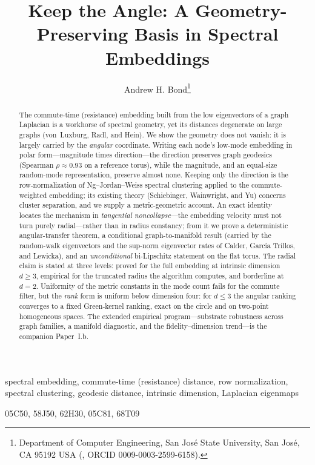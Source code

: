 \documentclass[review]{siamart220329}
\title{Keep the Angle: A Geometry-Preserving Basis in Spectral Embeddings}
\author{Andrew H. Bond\thanks{Department of Computer Engineering, San Jos\'e
State University, San Jos\'e, CA 95192 USA (\email{andrew.bond@sjsu.edu}, ORCID
0009-0003-2599-6158).}}
\begin{document}
\maketitle

\begin{abstract}
The commute-time (resistance) embedding built from the low eigenvectors of a
graph Laplacian is a workhorse of spectral geometry, yet its distances degenerate
on large graphs (von~Luxburg, Radl, and Hein). We show the geometry does not
vanish: it is largely carried by the \emph{angular} coordinate. Writing each
node's low-mode embedding in polar form---magnitude times direction---the
direction preserves graph geodesics (Spearman $\rho\approx0.93$ on a reference
torus), while the magnitude, and an equal-size random-mode representation,
preserve almost none. Keeping only the direction is the row-normalization of
Ng--Jordan--Weiss spectral clustering applied to the commute-weighted embedding;
its existing theory (Schiebinger, Wainwright, and Yu) concerns cluster
separation, and we supply a metric-geometric account. An exact identity locates
the mechanism in \emph{tangential noncollapse}---the embedding velocity must not
turn purely radial---rather than in radius constancy; from it we prove a
deterministic angular-transfer theorem, a conditional graph-to-manifold result
(carried by the random-walk eigenvectors and the sup-norm eigenvector rates of
Calder, Garc\'ia Trillos, and Lewicka), and an \emph{unconditional} bi-Lipschitz
statement on the flat torus. The radial claim is stated at three levels: proved
for the full embedding at intrinsic dimension $d\ge3$, empirical for the
truncated radius the algorithm computes, and borderline at $d=2$. Uniformity of
the metric constants in the mode count fails for the commute filter, but the
\emph{rank} form is uniform below dimension four: for $d\le3$ the angular ranking
converges to a fixed Green-kernel ranking, exact on the circle and on two-point
homogeneous spaces. The extended empirical program---substrate robustness across
graph families, a manifold diagnostic, and the fidelity--dimension trend---is the
companion Paper~I.b.
\end{abstract}

\begin{keywords}
spectral embedding, commute-time (resistance) distance, row normalization,
spectral clustering, geodesic distance, intrinsic dimension, Laplacian eigenmaps
\end{keywords}

\begin{AMS}
05C50, 58J50, 62H30, 05C81, 68T09
\end{AMS}
\end{document}

